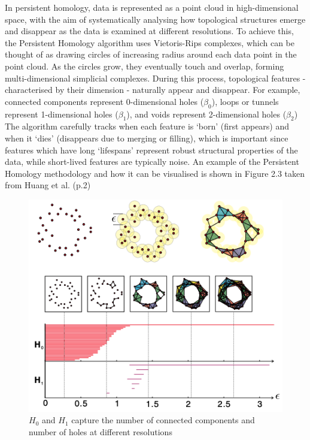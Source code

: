 \documentclass[12pt,twoside]{report}
\begin{document}
In persistent homology, data is represented as a point cloud in high-dimensional space, with the aim of systematically analysing how topological structures emerge and disappear as the data is examined at different resolutions. To achieve this, the Persistent Homology algorithm uses Vietoris-Rips complexes, which can be thought of as drawing circles of increasing radius around each data point in the point cloud. As the circles grow, they eventually touch and overlap, forming multi-dimensional simplicial complexes. During this process, topological features - characterised by their dimension - naturally appear and disappear. For example, connected components represent 0-dimensional holes ($\beta_0$), loops or tunnels represent 1-dimensional holes ($\beta_1$), and voids represent 2-dimensional holes ($\beta_2$) The algorithm carefully tracks when each feature is `born' (first appears) and when it `dies' (disappears due to merging or filling), which is important since features which have long `lifespans' represent robust structural properties of the data, while short-lived features are typically noise. An example of the Persistent Homology methodology and how it can be visualised is shown in Figure 2.3 taken from Huang et al. (p.2)

\begin{figure}[H]
\centering
\includegraphics[height = 0.2\textheight]{./figures/PHomology.png}
\caption{$H_0$ and $H_1$ capture the number of connected components and number of holes at different resolutions}
\label{fig:PersistentHomology}
\end{figure}
\end{document}
